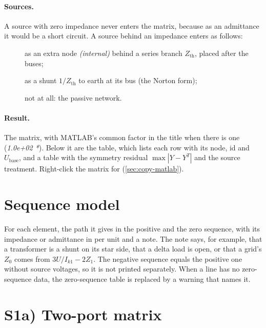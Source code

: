 

\paragraph{Sources.} A source with zero impedance never enters the matrix, because as an
admittance it would be a short circuit. A source behind an impedance enters as follows:
\begin{description}
  \item[] as an extra node \emph{(internal)} behind a series branch
    $Z_\text{th}$, placed after the buses;
  \item[] as a shunt $1/Z_\text{th}$ to earth at its bus (the Norton form);
  \item[] not at all: the passive network.
\end{description}

\paragraph{Result.} The matrix, with MATLAB's common factor in the title when there is
one (\emph{1.0e+02 *}). Below it are the  table, which lists each row with
its node, id and $U_\text{base}$, and a  table with the symmetry residual
$\max|Y - Y^T|$ and the source treatment. Right-click the matrix for 
(\cref{sec:copy-matlab}).

\section{Sequence model}

For each element, the path it gives in the positive and the zero sequence, with its
impedance or admittance in per unit and a note. The note says, for example, that a
 transformer is a shunt on its star side, that a delta load is open, or that a
grid's $Z_0$ comes from $3U/I_{k1} - 2Z_1$. The negative sequence equals the positive one
without source voltages, so it is not printed separately. When a line has no
zero-sequence data, the zero-sequence table is replaced by a warning that names it.



\section{S1a) Two-port matrix}\label{sec:study-s1a}

